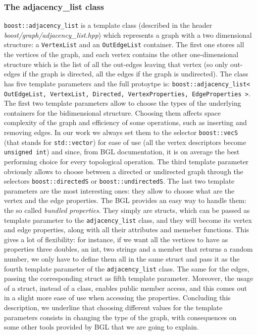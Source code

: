 \documentclass[10pt]{article} %
\newcommand{\classname}[1]{\texttt{#1}}
\begin{document}
	\subsubsection{The adjacency\_list class}
	\classname{boost::adjacency\_list} is a template class (described in the header \textit{boost/graph/adjacency\_list.hpp}) which represents a graph with a two dimensional structure: a \texttt{VertexList} and an \texttt{OutEdgeList} container. The first one stores all the vertices of the graph, and each vertex contains the other one-dimensional structure which is the list of all the out-edges leaving that vertex (so only out-edges if the graph is directed, all the edges if the graph is undirected). \newline
	The class has five template parameters and the full protoytpe is: \classname{boost::adjacency\_list< OutEdgeList, VertexList, Directed, VertexProperties, EdgeProperties >}. \newline
	The first two template parameters allow to choose the types of the underlying containers for the bidimensional structure. Choosing them affects space complexity of the graph and efficiency of some operations, such as inserting and removing edges. In our work we always set them to the selector \classname{boost::vecS} (that stands for \texttt{std::vector}) for ease of use (all the vertex descriptors become \texttt{unsigned int}) and since, from BGL documentation, it is on average the best performing choice for every topological operation. \newline
	The third template parameter obviously allows to choose between a directed or undirected graph through the selectors \texttt{boost::directedS} or \texttt{boost::undirectedS}.\newline
	The last two template parameters are the most interesting ones: they allow to choose what are the vertex and the edge properties. The BGL provides an easy way to handle them: the so called \textit{bundled properties}. They simply are structs, which can be passed as template parameter to the \classname{adjacency\_list} class, and they will become its vertex and edge properties, along with all their attributes and memeber functions. This gives a lot of flexibility: for instance, if we want all the vertices to have as properties three doubles, an int, two strings and a member that returns a random number, we only have to define them all in the same struct and pass it as the fourth template parameter of the \classname{adjacency\_list} class. The same for the edges, passing the corresponding struct as fifth template parameter. Moreover, the usage of a struct, instead of a class, enables public member access, and this comes out in a slight more ease of use when accessing the properties. \newline
	Concluding this description, we underline that choosing different values for the template parameters consists in changing the type of the graph, with consequences on some other tools provided by BGL that we are going to explain.
	
\end{document}
